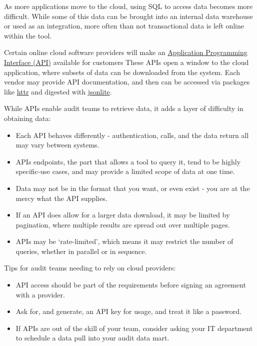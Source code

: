 \documentclass[
]{book}
\providecommand{\tightlist}{%
  \setlength{\itemsep}{0pt}\setlength{\parskip}{0pt}}
\begin{document}
As more applications move to the cloud, using SQL to access data becomes more difficult. While some of this data can be brought into an internal data warehouse or used as an integration, more often than not transactional data is left online within the tool.

Certain online cloud software providers will make an \protect\hyperlink{APIs}{Application Programming Interface (API)} available for customers These APIs open a window to the cloud application, where subsets of data can be downloaded from the system. Each vendor may provide API documentation, and then can be accessed via packages like \href{https://cran.r-project.org/web/packages/httr/index.html}{httr} and digested with \href{https://cran.r-project.org/web/packages/jsonlite/index.html}{jsonlite}.

While APIs enable audit teams to retrieve data, it adds a layer of difficulty in obtaining data:

\begin{itemize}
\tightlist
\item
  Each API behaves differently - authentication, calls, and the data return all may vary between systems.
\item
  APIs endpoints, the part that allows a tool to query it, tend to be highly specific-use cases, and may provide a limited scope of data at one time.
\item
  Data may not be in the format that you want, or even exist - you are at the mercy what the API supplies.
\item
  If an API does allow for a larger data download, it may be limited by pagination, where multiple results are spread out over multiple pages.
\item
  APIs may be `rate-limited', which means it may restrict the number of queries, whether in parallel or in sequence.
\end{itemize}

Tips for audit teams needing to rely on cloud providers:

\begin{itemize}
\tightlist
\item
  API access should be part of the requirements before signing an agreement with a provider.
\item
  Ask for, and generate, an API key for usage, and treat it like a password.
\item
  If APIs are out of the skill of your team, consider asking your IT department to schedule a data pull into your audit data mart.
\end{itemize}
\end{document}
